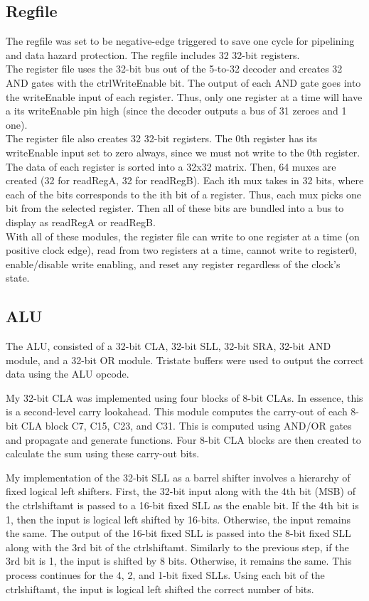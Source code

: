 \documentclass[a4paper,11pt]{article}
\begin{document}
\subsection*{Regfile}
The regfile was set to be negative-edge triggered to save one cycle for pipelining and data hazard protection. The regfile includes 32 32-bit registers. \\

The register file uses the 32-bit bus out of the 5-to-32 decoder and creates 32 AND gates with the ctrlWriteEnable bit. The output of each AND gate goes into the writeEnable input of each register. Thus, only one register at a time will have a its writeEnable pin high (since the decoder outputs a bus of 31 zeroes  and 1 one). \\

The register file also creates 32 32-bit registers. The 0th register has its writeEnable input set to zero always, since we must not write to the 0th register. The data of each register is sorted into a 32x32 matrix. Then, 64 muxes are created (32 for readRegA, 32 for readRegB). Each ith mux takes in 32 bits, where each of the bits corresponds to the ith bit of a register. Thus, each mux picks one bit from the selected register. Then all of these bits are bundled into a bus to display as readRegA or readRegB. \\

With all of these modules, the register file can write to one register at a time (on positive clock edge), read from two registers at a time, cannot write to register0, enable/disable write enabling, and reset any register regardless of the clock's state.\\

\subsection*{ALU}
The ALU, consisted of a 32-bit CLA, 32-bit SLL, 32-bit SRA, 32-bit AND module, and a 32-bit OR module. Tristate buffers were used to output the correct data using the ALU opcode. 

My 32-bit CLA was implemented using four blocks of 8-bit CLAs. In essence, this is a second-level carry lookahead. This module computes the carry-out of each 8-bit CLA block C7, C15, C23, and C31. This is computed using AND/OR gates and propagate and generate functions.  Four 8-bit CLA blocks are then created to calculate the sum using these carry-out bits.

My implementation of the 32-bit SLL as a barrel shifter involves a hierarchy of fixed logical left shifters. First, the 32-bit input along with the 4th bit (MSB) of the ctrlshiftamt is passed to a 16-bit fixed SLL as the enable bit. If the 4th bit is 1, then the input is logical left shifted by 16-bits. Otherwise, the input remains the same. The output of the 16-bit fixed SLL is passed into the 8-bit fixed SLL along with the 3rd bit of the ctrlshiftamt. Similarly to the previous step, if the 3rd bit is 1, the input is shifted by 8 bits. Otherwise, it remains the same. This process continues for the 4, 2, and 1-bit fixed SLLs. Using each bit of the ctrlshiftamt, the input is logical left shifted the correct number of bits.
\end{document}
